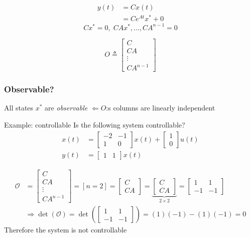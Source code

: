 \begin{align*}
    y(t) &= Cx(t) \\
    &= Ce^{At}x^* + 0
\end{align*}
\begin{equation*}
    Cx^* = 0, \; CAx^*, \ldots , CA^{n-1}=0
\end{equation*}

\begin{equation*}
    O \triangleq  \begin{bmatrix} C \\ CA \\ \vdots \\ CA^{n-1} \end{bmatrix}
\end{equation*}

\subsubsection{Observable?}
All states $x^*$ are \textit{observable} $\Leftarrow O$:s columns are linearly independent

\begin{exampleblock}{Example: controllable}
   Is the following system controllable?
   \begin{align*}
       x(t) &= \begin{bmatrix} -2 & -1 \\ 1 & 0 \end{bmatrix}x(t) 
       + \begin{bmatrix} 1 \\ 0 \end{bmatrix}u(t) \\ 
       y(t) &= \begin{bmatrix} 1 & 1 \end{bmatrix}x(t)
   \end{align*} 


   \begin{align*}
       \mathcal{O} &= \begin{bmatrix} C \\ CA \\ \vdots \\ CA^{n-1} \end{bmatrix} 
        = [n=2] = \begin{bmatrix} C \\ CA \end{bmatrix} 
        = \underbrace{\begin{bmatrix} C \\ CA \end{bmatrix}}_{2\times2} 
        = \begin{bmatrix} 1 & 1 \\ -1 & -1 \end{bmatrix} \\
        &\Rightarrow \det(\mathcal{O}) 
        =\det\left( \begin{bmatrix} 1 & 1 \\ -1 & -1 \end{bmatrix} \right) 
        = (1)(-1) -(1)(-1) = 0
   \end{align*}
   Therefore the system is not controllable
\end{exampleblock}

